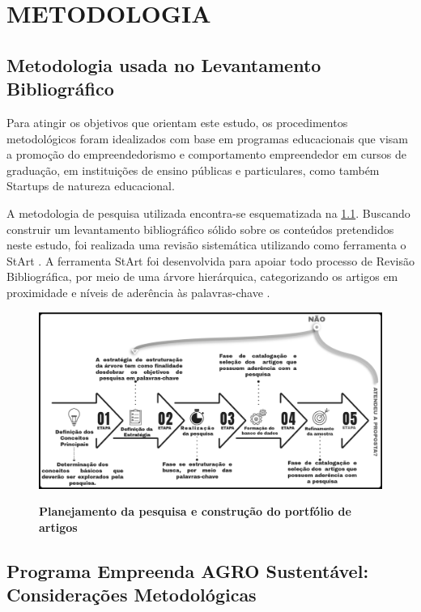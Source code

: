 \chapter{METODOLOGIA}

\section{Metodologia usada no Levantamento Bibliográfico}


Para atingir os objetivos que orientam este estudo, os procedimentos metodológicos foram idealizados com base em programas educacionais que visam a promoção do empreendedorismo e comportamento empreendedor em cursos de graduação, em instituições de ensino públicas e particulares, como também Startups de natureza educacional.


A metodologia de pesquisa utilizada encontra-se esquematizada na \ref{figura_29}. Buscando construir um levantamento bibliográfico sólido sobre os conteúdos pretendidos neste estudo, foi realizada uma revisão sistemática utilizando como ferramenta o StArt \cite{lapes_start_2016}. A ferramenta StArt foi desenvolvida para apoiar todo processo de Revisão Bibliográfica, por meio de uma árvore hierárquica, categorizando os artigos em proximidade e níveis de aderência às palavras-chave \cite{hernandes_avaliacao_2010}.


\begin{figure}[H]
\centering
\caption{\textbf{Planejamento da pesquisa e construção do portfólio de artigos}}
\includegraphics[scale=0.28]{Imagens/fases_pesquisa_bibliografica.png}
\label{figura_29}
\end{figure}


\section{Programa Empreenda AGRO Sustentável: Considerações Metodológicas}


